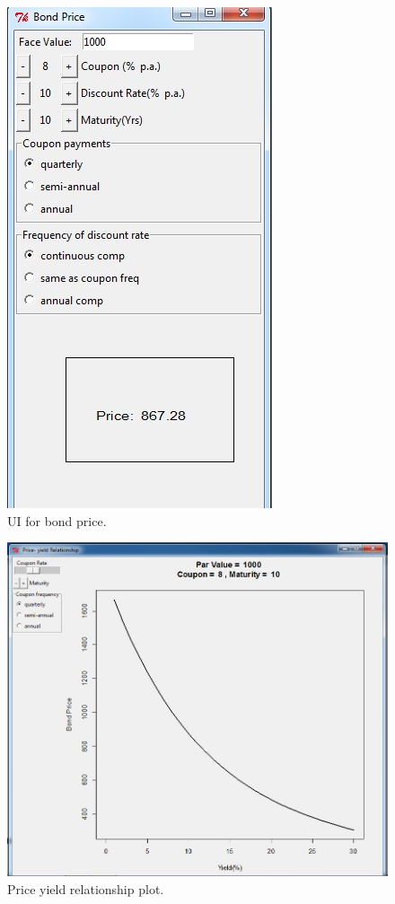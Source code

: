\documentclass{article}
\begin{document}
\begin{figure}
\centering
\includegraphics{bondprice.jpg}
\caption[]{UI for bond price.}
\label{Fig:calcbond}
\end{figure}

\begin{figure}
\centering
\includegraphics[width=1\textwidth]{priceyield2.jpg}
\caption[]{Price yield relationship plot.}
\label{Fig:tkrplotpriceyld}
\end{figure}
\end{document}
